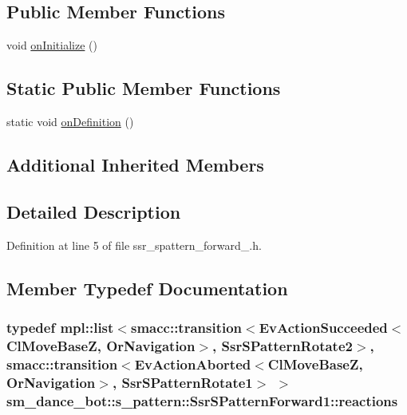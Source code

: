 \subsection*{Public Member Functions}
\begin{DoxyCompactItemize}
\item 
void \hyperlink{structsm__dance__bot_1_1s__pattern_1_1SsrSPatternForward1_a67d1420b54175d05b3a3c80c088c1ba6}{on\+Initialize} ()
\end{DoxyCompactItemize}
\subsection*{Static Public Member Functions}
\begin{DoxyCompactItemize}
\item 
static void \hyperlink{structsm__dance__bot_1_1s__pattern_1_1SsrSPatternForward1_a386f1f6072b9cd14808ec21c6276b941}{on\+Definition} ()
\end{DoxyCompactItemize}
\subsection*{Additional Inherited Members}


\subsection{Detailed Description}


Definition at line 5 of file ssr\+\_\+spattern\+\_\+forward\+\_.\+h.



\subsection{Member Typedef Documentation}
\subsubsection[{\texorpdfstring{reactions}{reactions}}]{\setlength{\rightskip}{0pt plus 5cm}typedef mpl\+::list$<${\bf smacc\+::transition}$<$Ev\+Action\+Succeeded$<${\bf Cl\+Move\+BaseZ}, {\bf Or\+Navigation}$>$, {\bf Ssr\+S\+Pattern\+Rotate2}$>$, {\bf smacc\+::transition}$<$Ev\+Action\+Aborted$<${\bf Cl\+Move\+BaseZ}, {\bf Or\+Navigation}$>$, {\bf Ssr\+S\+Pattern\+Rotate1}$>$ $>$ {\bf sm\+\_\+dance\+\_\+bot\+::s\+\_\+pattern\+::\+Ssr\+S\+Pattern\+Forward1\+::reactions}}\hypertarget{structsm__dance__bot_1_1s__pattern_1_1SsrSPatternForward1_a6cf29be8f920da0d2f4176ee9f49f495}{}\label{structsm__dance__bot_1_1s__pattern_1_1SsrSPatternForward1_a6cf29be8f920da0d2f4176ee9f49f495}



